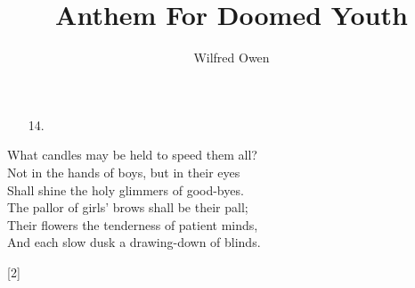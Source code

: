 \documentclass{article}
\begin{document}
\title{Anthem For Doomed Youth}
\author{Wilfred Owen}
\date{}

\maketitle

\thispagestyle{empty} %
\hrulefill
\bigskip

\doublespacing

\flushright
\begin{multicols}{2}

    \begin{minipage}{1cm}
        \begin{enumerate}[itemsep=2.8ex]
            \item[] 
            \item[] 
            \item[] 
            \item[14.] 
        \end{enumerate}
    \end{minipage}

    \begin{minipage}{7cm}
            What candles may be held to speed them all?\\
            Not in the hands of boys, but in their eyes\\
            Shall shine the holy glimmers of good-byes.\\
            The pallor of girls' brows shall be their pall;\\
            Their flowers the tenderness of patient minds,\\
            And each slow dusk a drawing-down of blinds.\\

            \begin{center}[2]\end{center}
            
    \end{minipage}
\end{multicols}

\vspace*{\fill}

\flushleft
\end{document}
